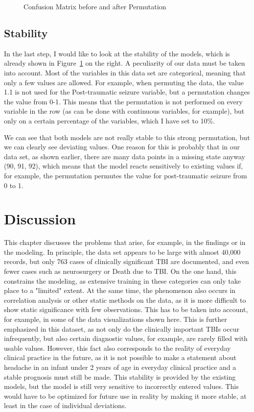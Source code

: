 \documentclass[10pt,letterpaper]{article}
\begin{document}
\begin{figure}[H]
    \centering
    \caption{Confusion Matrix before and after Permutation}
    \label{fig:confusion_matrix}
\end{figure}

\subsection{Stability}
In the last step, I would like to look at the stability of the models, which is already shown in Figure~\ref{fig:confusion_matrix} on the right. A peculiarity of our data must be taken into account. Most of the variables in this data set are categorical, meaning that only a few values are allowed. For example, when permuting the data, the value 1.1 is not used for the Post-traumatic seizure variable, but a permutation changes the value from 0-1. This means that the permutation is not performed on every variable in the row (as can be done with continuous variables, for example), but only on a certain percentage of the variables, which I have set to 10\%. 

We can see that both models are not really stable to this strong permutation, but we can clearly see deviating values. One reason for this is probably that in our data set, as shown earlier, there are many data points in a missing state anyway (90, 91, 92), which means that the model reacts sensitively to existing values if, for example, the permutation permutes the value for post-traumatic seizure from 0 to 1.

\section{Discussion}\label{discussion}

This chapter discusses the problems that arise, for example, in the findings or in the modeling. In principle, the data set appears to be large with almost 40,000 records, but only 763 cases of clinically significant TBI are documented, and even fewer cases such as neurosurgery or Death due to TBI. On the one hand, this constrains the modeling, as extensive training in these categories can only take place to a "limited" extent. At the same time, the phenomenon also occurs in correlation analysis or other static methods on the data, as it is more difficult to show static significance with few observations. This has to be taken into account, for example, in some of the data visualizations shown here. This is further emphasized in this dataset, as not only do the clinically important TBIs occur infrequently, but also certain diagnostic values, for example, are rarely filled with usable values. However, this fact also corresponds to the reality of everyday clinical practice in the future, as it is not possible to make a statement about headache in an infant under 2 years of age in everyday clinical practice and a stable prognosis must still be made. This stability is provided by the existing models, but the model is still very sensitive to incorrectly entered values. This would have to be optimized for future use in reality by making it more stable, at least in the case of individual deviations.
\end{document}
